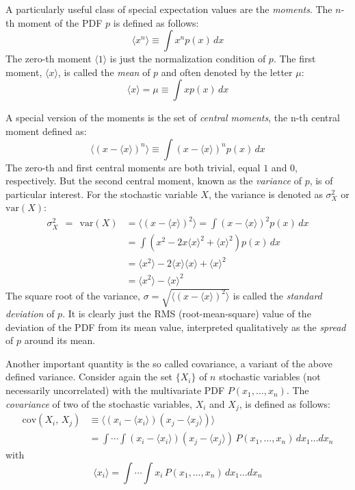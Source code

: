 \documentclass[graybox,sectrefs,envcountresetchap,open=right]{svmonodo}
\begin{document}
A particularly useful class of special expectation values are the
\emph{moments}. The $n$-th moment of the PDF $p$ is defined as
follows:
\[
\langle x^n\rangle \equiv \int\! x^n p(x)\,dx
\]
The zero-th moment $\langle 1\rangle$ is just the normalization condition of
$p$. The first moment, $\langle x\rangle$, is called the \emph{mean} of $p$
and often denoted by the letter $\mu$:
\[
\langle x\rangle = \mu \equiv \int\! x p(x)\,dx
\]





A special version of the moments is the set of \emph{central moments},
the n-th central moment defined as:
\[
\langle (x-\langle x \rangle )^n\rangle \equiv \int\! (x-\langle x\rangle)^n p(x)\,dx
\]
The zero-th and first central moments are both trivial, equal $1$ and
$0$, respectively. But the second central moment, known as the
\emph{variance} of $p$, is of particular interest. For the stochastic
variable $X$, the variance is denoted as $\sigma^2_X$ or $\mathrm{var}(X)$:
\begin{align}
\sigma^2_X\ \ =\ \ \mathrm{var}(X) & =  \langle (x-\langle x\rangle)^2\rangle =
\int\! (x-\langle x\rangle)^2 p(x)\,dx\\
& =  \int\! \left(x^2 - 2 x \langle x\rangle^{2} +
  \langle x\rangle^2\right)p(x)\,dx\\
& =  \langle x^2\rangle - 2 \langle x\rangle\langle x\rangle + \langle x\rangle^2\\
& =  \langle x^2\rangle - \langle x\rangle^2
\end{align}
The square root of the variance, $\sigma =\sqrt{\langle (x-\langle x\rangle)^2\rangle}$ is called the \emph{standard deviation} of $p$. It is clearly just the RMS (root-mean-square)
value of the deviation of the PDF from its mean value, interpreted
qualitatively as the \emph{spread} of $p$ around its mean.





Another important quantity is the so called covariance, a variant of
the above defined variance. Consider again the set $\{X_i\}$ of $n$
stochastic variables (not necessarily uncorrelated) with the
multivariate PDF $P(x_1,\dots,x_n)$. The \emph{covariance} of two
of the stochastic variables, $X_i$ and $X_j$, is defined as follows:
\begin{align}
\mathrm{cov}(X_i,\,X_j) &\equiv \langle (x_i-\langle x_i\rangle)(x_j-\langle x_j\rangle)\rangle
\nonumber\\
&=
\int\!\cdots\!\int\!(x_i-\langle x_i \rangle)(x_j-\langle x_j \rangle)\,
P(x_1,\dots,x_n)\,dx_1\dots dx_n
\label{eq:def_covariance}
\end{align}
with
\[
\langle x_i\rangle =
\int\!\cdots\!\int\!x_i\,P(x_1,\dots,x_n)\,dx_1\dots dx_n
\]
\end{document}
